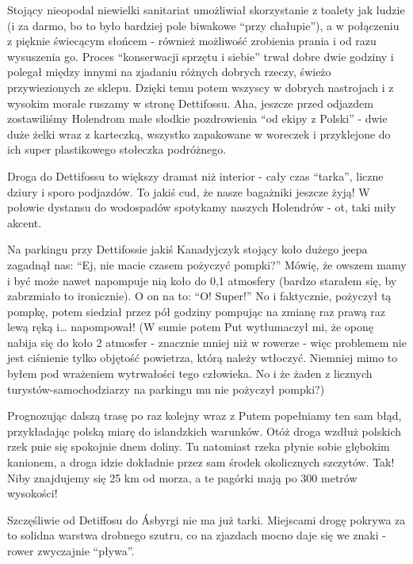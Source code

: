 Stojący nieopodal niewielki sanitariat umożliwiał skorzystanie z toalety jak ludzie (i za darmo, bo to było bardziej pole biwakowe “przy chałupie”), a w połączeniu z pięknie świecącym słońcem - również możliwość zrobienia prania i od razu wysuszenia go. Proces “konserwacji sprzętu i siebie” trwał dobre dwie godziny i polegał między innymi na zjadaniu różnych dobrych rzeczy, świeżo przywiezionych ze sklepu. Dzięki temu potem wszyscy w dobrych nastrojach i z wysokim morale ruszamy w stronę Dettifossu. Aha, jeszcze przed odjazdem zostawiliśmy Holendrom małe słodkie pozdrowienia “od ekipy z Polski” - dwie duże żelki wraz z karteczką, wszystko zapakowane w woreczek i przyklejone do ich super plastikowego stołeczka podróżnego.

Droga do Dettifossu to większy dramat niż interior - cały czas “tarka”, liczne dziury i sporo podjazdów. To jakiś cud, że nasze bagażniki jeszcze żyją! W połowie dystansu do wodospadów spotykamy naszych Holendrów - ot, taki miły akcent.


Na parkingu przy Dettifossie jakiś Kanadyjczyk stojący koło dużego jeepa zagadnął nas: “Ej, nie macie czasem pożyczyć pompki?” Mówię, że owszem mamy i być może nawet napompuje nią koło do 0,1 atmosfery (bardzo starałem się, by zabrzmiało to ironicznie). O on na to: “O! Super!” No i faktycznie, pożyczył tą pompkę, potem siedział przez pół godziny pompując na zmianę raz prawą raz lewą ręką i… napompował! (W sumie potem Put wytłumaczył mi, że oponę nabija się do koło 2 atmosfer - znacznie mniej niż w rowerze - więc problemem nie jest ciśnienie tylko objętość powietrza, którą należy wtłoczyć. Niemniej mimo to byłem pod wrażeniem wytrwałości tego człowieka. No i że żaden z licznych turystów-samochodziarzy na parkingu mu nie pożyczył pompki?)

Prognozując dalszą trasę po raz kolejny wraz z Putem popełniamy ten sam błąd, przykładając polską miarę do islandzkich warunków. Otóż droga wzdłuż polskich rzek pnie się spokojnie dnem doliny. Tu natomiast rzeka płynie sobie głębokim kanionem, a droga idzie dokładnie przez sam środek okolicznych szczytów. Tak! Niby znajdujemy się 25 km od morza, a te pagórki mają po 300 metrów wysokości!

Szczęśliwie od Detiffosu do Ásbyrgi nie ma już tarki. Miejscami drogę pokrywa za to solidna warstwa drobnego szutru, co na zjazdach mocno daje się we znaki - rower zwyczajnie “pływa”.

